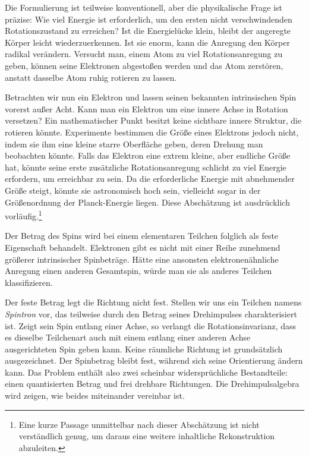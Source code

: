 Die Formulierung ist teilweise konventionell, aber die physikalische Frage ist präzise: Wie viel Energie ist erforderlich, um den ersten nicht verschwindenden Rotationszustand zu erreichen? Ist die Energielücke klein, bleibt der angeregte Körper leicht wiederzuerkennen. Ist sie enorm, kann die Anregung den Körper radikal verändern. Versucht man, einem Atom zu viel Rotationsanregung zu geben, können seine Elektronen abgestoßen werden und das Atom zerstören, anstatt dasselbe Atom ruhig rotieren zu lassen.

Betrachten wir nun ein Elektron und lassen seinen bekannten intrinsischen Spin vorerst außer Acht. Kann man ein Elektron um eine innere Achse in Rotation versetzen? Ein mathematischer Punkt besitzt keine sichtbare innere Struktur, die rotieren könnte. Experimente bestimmen die Größe eines Elektrons jedoch nicht, indem sie ihm eine kleine starre Oberfläche geben, deren Drehung man beobachten könnte. Falls das Elektron eine extrem kleine, aber endliche Größe hat, könnte seine erste zusätzliche Rotationsanregung schlicht zu viel Energie erfordern, um erreichbar zu sein. Da die erforderliche Energie mit abnehmender Größe steigt, könnte sie astronomisch hoch sein, vielleicht sogar in der Größenordnung der Planck-Energie liegen. Diese Abschätzung ist ausdrücklich vorläufig.\footnote{Eine kurze Passage unmittelbar nach dieser Abschätzung ist nicht verständlich genug, um daraus eine weitere inhaltliche Rekonstruktion abzuleiten.}

Der Betrag des Spins wird bei einem elementaren Teilchen folglich als feste Eigenschaft behandelt. Elektronen gibt es nicht mit einer Reihe zunehmend größerer intrinsischer Spinbeträge. Hätte eine ansonsten elektronenähnliche Anregung einen anderen Gesamtspin, würde man sie als anderes Teilchen klassifizieren.

Der feste Betrag legt die Richtung nicht fest. Stellen wir uns ein Teilchen namens \emph{Spintron} vor, das teilweise durch den Betrag seines Drehimpulses charakterisiert ist. Zeigt sein Spin entlang einer Achse, so verlangt die Rotationsinvarianz, dass es dieselbe Teilchenart auch mit einem entlang einer anderen Achse ausgerichteten Spin geben kann. Keine räumliche Richtung ist grundsätzlich ausgezeichnet. Der Spinbetrag bleibt fest, während sich seine Orientierung ändern kann. Das Problem enthält also zwei scheinbar widersprüchliche Bestandteile: einen quantisierten Betrag und frei drehbare Richtungen. Die Drehimpulsalgebra wird zeigen, wie beides miteinander vereinbar ist.

